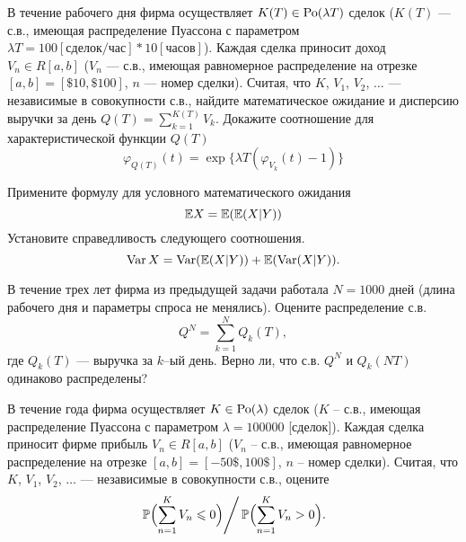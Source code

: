 \begin{problem}
В течение рабочего дня фирма осуществляет $K(T)\in \mathrm{Po}(\lambda T)$ сделок ($K(T)$ --- с.в., имеющая распределение Пуассона с параметром 
$\lambda T = 100 [\text{сделок/час}] * 10 [\text{часов}]$). Каждая сделка приносит доход $V_n\in R[a,b]$ ($V_n$ --- с.в., имеющая 
равномерное распределение на отрезке $[a,b]=[\$ 10, \$ 100]$, $n$ --- номер сделки). Считая, что $K$, $V_1$, $V_2$, $\ldots$ --- 
независимые в совокупности с.в., найдите математическое ожидание и дисперсию выручки за день $Q(T)=\sum\limits_{k=1}^{K(T)} V_k$. Докажите соотношение для характеристической функции $Q(T)$
$$
\varphi_{Q(T)}(t)=\exp\{ \lambda T(\varphi_{V_k}(t)-1)\} 
$$
   
\end{problem}

\begin{ordre}

Примените формулу для условного математического ожидания  
$$
{\mathbb E}X= \mathrm{{\mathbb E}}{( {\mathbb E}(X|Y) )} 
$$
Установите справедливость следующего соотношения.
$$
\mathop{\mathrm{Var}}\nolimits X=\mathop{\mathrm{Var}}\nolimits({\mathbb E}(X|Y))+{\mathbb E}(\mathop{\mathrm{Var}}\nolimits(X|Y)) . 
$$

\end{ordre}


\begin{problem}
В течение трех лет фирма из предыдущей задачи работала $N=1000$ дней (длина рабочего дня и параметры спроса не менялись). 
Оцените распределение с.в. 
$$Q^N=\sum\limits_{k=1}^{N} Q_k(T), 
$$
где $Q_k(T)$ --- выручка за $k$–ый день. Верно ли, что с.в. $Q^N$ и $Q_k(NT)$ одинаково распределены? 
\end{problem}


\begin{problem}
В течение года фирма осуществляет $K\in \mathrm{Po}(\lambda)$ сделок ($K$ -- с.в., имеющая распределение Пуассона с параметром  $\lambda=100000$ 
[сделок]). Каждая сделка приносит фирме прибыль $V_n\in R[a,b]$ ($V_n$ -- с.в., имеющая равномерное распределение на отрезке 
$[a,b]=[-50\$,100\$]$, $n$ -- номер сделки). Считая, что $K$, $V_1$, $V_2$, $\ldots$ --- независимые в совокупности с.в., оцените 
\begin{equation}
\label{ProbRatio}
\left. {\mathbb P}\Bigl(\sum\limits_{n=1}^{K} V_n\leqslant 0\Bigr)\right/{\mathbb P}\Bigl(\sum\limits_{n=1}^{K} V_n>0\Bigr) . 
\end{equation}
\end{problem}

